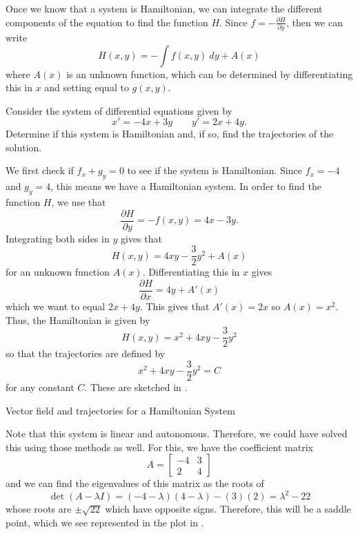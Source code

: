 Once we know that a system is Hamiltonian, we can integrate the different components of the equation to find the function $H$. Since $f = -\frac{\partial H}{\partial y}$, then we can write
\[ H(x,y) = -\int f(x,y)\ dy + A(x) \] where $A(x)$ is an unknown function, which can be determined by differentiating this in $x$ and setting equal to $g(x,y)$.

\begin{example}
Consider the system of differential equations given by
\[ x' = -4x + 3y \qquad y' = 2x + 4y. \]
Determine if this system is Hamiltonian and, if so, find the trajectories of the solution.
\end{example}

\begin{exampleSol}
We first check if $f_x + g_y = 0$ to see if the system is Hamiltonian. Since $f_x = -4$ and $g_y = 4$, this means we have a Hamiltonian system. In order to find the function $H$, we use that
\[ \frac{\partial H}{\partial y} = -f(x,y) = 4x - 3y. \]
Integrating both sides in $y$ gives that
\[ H(x,y) = 4xy - \frac{3}{2}y^2 + A(x) \] for an unknown function $A(x)$. Differentiating this in $x$ gives 
\[ \frac{\partial H}{\partial x} = 4y + A'(x) \] which we want to equal $2x + 4y$. This gives that $A'(x) = 2x$ so $A(x) = x^2$. Thus, the Hamiltonian is given by
\[ H(x,y) = x^2 + 4xy - \frac{3}{2}y^2 \] so that the trajectories are defined by 
\[ x^2 + 4xy - \frac{3}{2}y^2 = C\] for any constant $C$. These are sketched in .

\begin{myfig}
\capstart
{}
\caption{Vector field and trajectories for a Hamiltonian System \label{fig:HamilPlot}}
\end{myfig}

Note that this system is linear and autonomous. Therefore, we could have solved this using those methods as well. For this, we have the coefficient matrix 
\begin{equation*}
A = \begin{bmatrix} 
-4 & 3 \\ 2 & 4 \end{bmatrix}
\end{equation*}
and we can find the eigenvalues of this matrix as the roots of
\begin{equation*}
\det(A - \lambda I) = (-4-\lambda)(4-\lambda) - (3)(2)  = \lambda^2 - 22
\end{equation*}
whose roots are $\pm\sqrt{22}$ which have opposite signs. Therefore, this will be a saddle point, which we see represented in the plot in .
\end{exampleSol}


